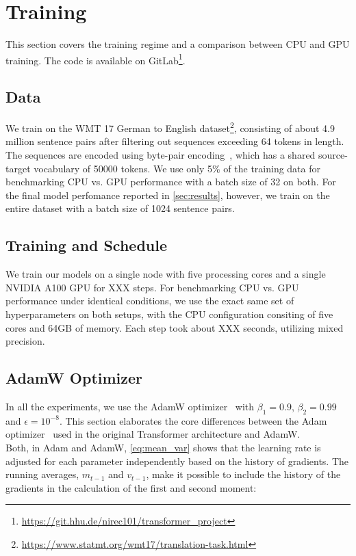\section{Training}
This section covers the training regime and a comparison between CPU and GPU training.
The code is available on GitLab\footnote{\url{https://git.hhu.de/nirec101/transformer_project}}.

\subsection{Data}
We train on the WMT 17 German to English dataset\footnote{\url{https://www.statmt.org/wmt17/translation-task.html}}, consisting of about 4.9 million sentence pairs after filtering out sequences exceeding 64 tokens in length.
The sequences are encoded using byte-pair encoding~\cite{britz2017massiveexplorationneuralmachine}, which has a shared source-target vocabulary of 50000 tokens.
We use only 5\% of the training data for benchmarking CPU vs. GPU performance with a batch size of 32 on both.
For the final model perfomance reported in \cref{sec:results}, however, we train on the entire dataset with a batch size of 1024 sentence pairs.

\subsection{Training and Schedule}
We train our models on a single node with five processing cores and a single NVIDIA A100 GPU for XXX steps.
For benchmarking CPU vs. GPU performance under identical conditions, we use the exact same set of hyperparameters on both setups, with the CPU configuration consiting of five cores and 64GB of memory.
Each step took about XXX seconds, utilizing mixed precision.


\subsection{AdamW Optimizer}
In all the experiments, we use the AdamW optimizer~\cite{loshchilov2019decoupledweightdecayregularization} with \(\beta_1=0.9\), \(\beta_2=0.99\) and \(\epsilon=10^{-8}\).
This section elaborates the core differences between the Adam optimizer~\cite{kingma2017adammethodstochasticoptimization} used in the original Transformer architecture and AdamW.\\
Both, in Adam and AdamW, \cref{eq:mean_var} shows that the learning rate is adjusted for each parameter independently based on the history of gradients.
The running averages, \(m_{t-1}\) and \(v_{t-1}\), make it possible to include the history of the gradients in the calculation of the first and second moment:

